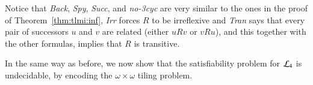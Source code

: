 \begin{pf}
Notice that \textit{Back}, \textit{Spy}, \textit{Succ}, and
\textit{no-3cyc} are very similar to the ones in the proof of
Theorem~\ref{thm:tlmi:inf}, \textit{Irr} forces $R$ to be
irreflexive and \textit{Tran} says that every pair of successors $u$
and $v$ are related (either $uRv$ or $vRu$), and this together with
the other formulas, implies that $R$ is transitive.

%
%
\end{pf}


In the same way as before, we now show that the satisfiability
problem for $\mathcal{L}_4$ is undecidable, by encoding the $\omega
\times \omega$ tiling problem.

